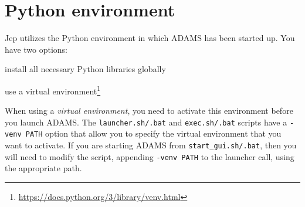 \documentclass[a4paper]{book}
\begin{document}
\section{Python environment}
Jep utilizes the Python environment in which ADAMS has been started up. You have two options:
\begin{tight_itemize}
    \item install all necessary Python libraries globally
    \item use a virtual environment\footnote{\url{https://docs.python.org/3/library/venv.html}{}}
\end{tight_itemize}

\noindent When using a \textit{virtual environment}, you need to activate this environment before you launch
ADAMS. The \texttt{launcher.sh/.bat} and \texttt{exec.sh/.bat} scripts have a \texttt{-venv PATH}
option that allow you to specify the virtual environment that you want to activate.
If you are starting ADAMS from \texttt{start\_gui.sh/.bat}, then you will need to modify
the script, appending \texttt{-venv PATH} to the launcher call, using the appropriate path.


\end{document}
